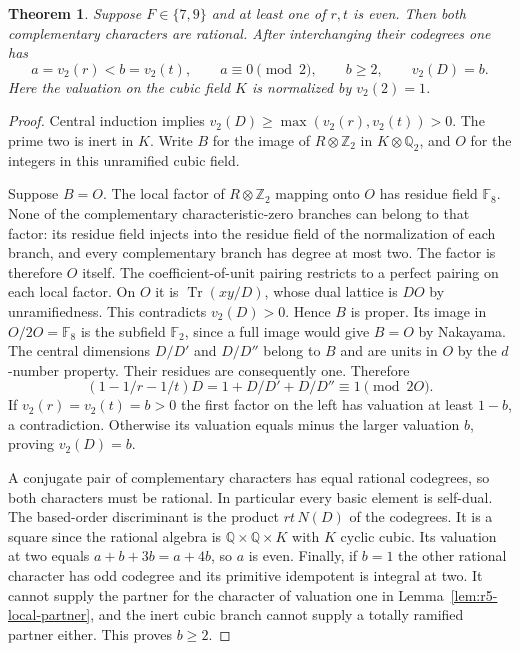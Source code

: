 \documentclass[11pt,a4paper]{article}
\newtheorem{theorem}{Theorem}[section]
\numberwithin{equation}{section}
\begin{document}
\begin{theorem}\label{thm:cubic-at-two}
Suppose $F\in\{7,9\}$ and at least one of $r,t$ is even. Then both
complementary characters are rational. After interchanging their
codegrees one has
\[
 a=v_2(r)<b=v_2(t),\qquad a\equiv0\pmod2,\qquad
 b\ge 2,\qquad v_2(D)=b.
\]
Here the valuation on the cubic field $K$ is normalized by $v_2(2)=1$.
\end{theorem}
\begin{proof}
Central induction implies
$v_2(D)\ge\max(v_2(r),v_2(t))>0$. The prime two is inert in $K$.
Write $B$ for the image of $R\otimes\mathbb Z_2$ in $K\otimes\mathbb Q_2$,
and $O$ for the integers in this unramified cubic field.

Suppose $B=O$. The local factor of $R\otimes\mathbb Z_2$ mapping onto $O$
has residue field $\mathbb F_8$. None of the complementary characteristic-zero
branches can belong to that factor: its residue field injects into the
residue field of the normalization of each branch, and every
complementary branch has degree at most two. The factor is therefore
$O$ itself. The coefficient-of-unit pairing restricts to a perfect
pairing on each local factor. On $O$ it is $\operatorname{Tr}(xy/D)$,
whose dual lattice is $DO$ by unramifiedness. This contradicts $v_2(D)>0$.
Hence $B$ is proper. Its image in $O/2O=\mathbb F_8$ is the subfield
$\mathbb F_2$, since a full image would give $B=O$ by Nakayama.
The central dimensions $D/D'$ and $D/D''$ belong to $B$ and are units
in $O$ by the $d$-number property. Their residues are consequently one.
Therefore
\[
  (1-1/r-1/t)D=1+D/D'+D/D''\equiv1\pmod{2O}.
\]
If $v_2(r)=v_2(t)=b>0$ the first factor on the left has valuation at
least $1-b$, a contradiction. Otherwise its valuation equals minus
the larger valuation $b$, proving $v_2(D)=b$.

A conjugate pair of complementary characters has equal rational
codegrees, so both characters must be rational. In particular every
basic element is self-dual. The based-order discriminant is the product
$r t\,N(D)$ of the codegrees. It is a square since the rational
algebra is $\mathbb Q\times\mathbb Q\times K$ with $K$ cyclic cubic.
Its valuation at two equals $a+b+3b=a+4b$, so $a$ is even. Finally,
if $b=1$ the other rational character has odd codegree and its
primitive idempotent is integral at two. It cannot supply the partner
for the character of valuation one in Lemma~\ref{lem:r5-local-partner},
and the inert cubic branch cannot supply a totally ramified partner
either. This proves $b\ge2$.
\end{proof}
\end{document}
